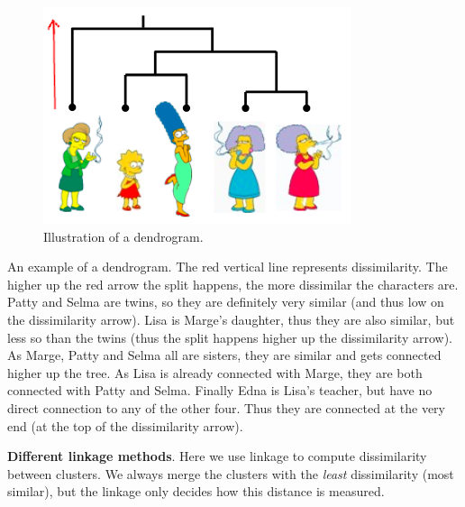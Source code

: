 \documentclass{article}
\begin{document}
\begin{minipage}{0.5\textwidth}
\begin{figure}[H]
\includegraphics[width=0.9\linewidth]{hierarchical_clustering.png}
\caption{\label{fig:roc} Illustration of a dendrogram.}
\end{figure}
\end{minipage} \hfill
\begin{minipage}{0.5\textwidth}
An example of a dendrogram. The red vertical line represents dissimilarity. The higher up the red arrow the split happens, the more dissimilar the characters are. Patty and Selma are twins, so they are definitely very similar (and thus low on the dissimilarity arrow). Lisa is Marge's daughter, thus they are also similar, but less so than the twins (thus the split happens higher up the dissimilarity arrow). As Marge, Patty and Selma all are sisters, they are similar and gets connected higher up the tree. As Lisa is already connected with Marge, they are both connected with Patty and Selma. Finally Edna is Lisa's teacher, but have no direct connection to any of the other four. Thus they are connected at the very end (at the top of the dissimilarity arrow).        
\end{minipage}
\textbf{Different linkage methods}. Here we use linkage to compute dissimilarity between clusters. We always merge the clusters with the \textit{least} dissimilarity (most similar), but the linkage only decides how this distance is measured.  
\end{document}
